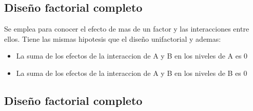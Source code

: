 \documentclass[a4paper]{article}
\begin{document}
\subsection*{Diseño factorial completo}
Se emplea para conocer el efecto de mas de un factor y las interacciones entre ellos.
Tiene las mismas hipotesis que el diseño unifactorial y ademas:
\begin{itemize}
    \item La suma de los efectos de la interaccion de A y B en los niveles de A es 0
    \item La suma de los efectos de la interaccion de A y B en los niveles de B es 0
\end{itemize}

\subsection*{Diseño factorial completo}
\end{document}
